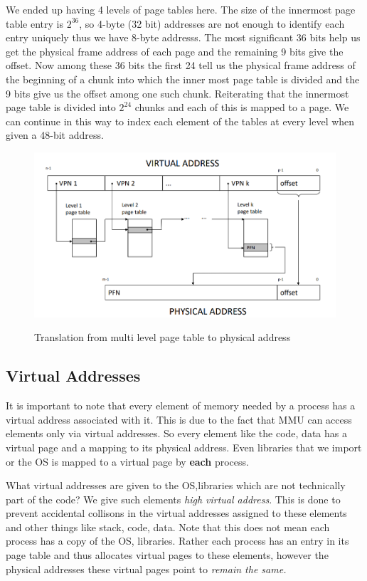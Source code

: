 \documentclass[12pt]{article}
\begin{document}
We ended up having 4 levels of page tables here. The size of the innermost page table entry is \(2^{36}\), so 4-byte (32 bit) addresses are not enough to identify each entry uniquely thus we have 8-byte addresss.  The most significant 36 bits help us get the physical frame address of each page and the remaining 9 bits give the offset.
Now among these 36 bits the first 24 tell us the physical frame address of the beginning of a chunk into which the inner most page table is divided and the 9 bits give us the offset among one such chunk. Reiterating that the innermost page table is divided into \(2^{24}\) chunks and each of this is mapped to a page. We can continue in this way to 
index each element of the tables at every level when given a 48-bit address.
 
\begin{figure}[h]
    \begin{center}
        \includegraphics[width = 12cm]{mulit_level_page.png}
        \label{figure:multi_level_page_table}
        \caption{Translation from multi level page table to physical address }
    \end{center}
\end{figure}

\subsection{Virtual Addresses}
It is important to note that every element of memory needed by a process has a virtual address associated with it. This is due to the fact that MMU can access elements only via
virtual addresses. So every element like the code, data has a virtual page and a mapping to its physical address. Even libraries that we import or the OS is mapped to a virtual
page by \textbf{each} process.

What virtual addresses are given to the OS,libraries which are not technically part of the code? We give such elements \textit{high virtual address}. This is done to prevent accidental
collisons in the virtual addresses assigned to these elements and other things like stack, code, data. Note that this does not mean each process has a copy of the OS, libraries. Rather each process
has an entry in its page table and thus allocates virtual pages to these elements, however the physical addresses these virtual pages point to \textit{remain the same.}
\end{document}

